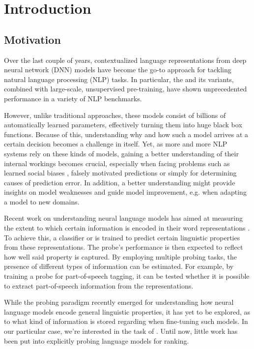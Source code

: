 \chapter{Introduction}
\section{Motivation}
Over the last couple of years, contextualized language representations from deep neural network (DNN) models have become the go-to approach for tackling natural language processing (NLP) tasks. In particular, the  \cite{vaswani2017attention} and its variants, combined with large-scale, unsupervised pre-training, have shown unprecedented performance in a variety of NLP benchmarks.

However, unlike traditional approaches, these models consist of billions of automatically learned parameters, effectively turning them into huge black box functions. Because of this, understanding why and how such a model arrives at a certain decision becomes a challenge in itself. Yet, as more and more NLP systems rely on these kinds of models, gaining a better understanding of their internal workings becomes crucial, especially when facing problems such as learned social biases \cite{Nadeem2021StereoSetMS,Bender2021OnTD, kurita2019measuring}, falsely motivated predictions \cite{10.1145/2939672.2939778, DBLP:journals/corr/abs-1802-00614} or simply for determining causes of prediction error. In addition, a better understanding might provide insights on model weaknesses and guide model improvement, e.g. when adapting a model to new domains.

Recent work on understanding neural language models has aimed at measuring the extent to which certain information is encoded in their word representations \cite{tenney-etal-2019-bert,Tenney2019WhatDY,DBLP:journals/corr/abs-1909-03368}. To achieve this, a  classifier or  is trained to predict certain linguistic properties from these representations. The probe's performance is then expected to reflect how well said property is captured. By employing multiple probing tasks, the presence of different types of information can be estimated. For example, by training a probe for part-of-speech tagging, it can be tested whether it is possible to extract part-of-speech information from the representations.

While the probing paradigm recently emerged for understanding how neural language models encode general linguistic properties, it has yet to be explored, as to what kind of information is stored regarding  when fine-tuning such models. In our particular case, we're interested in the task of . Until now, little work has been put into explicitly probing language models for ranking.

